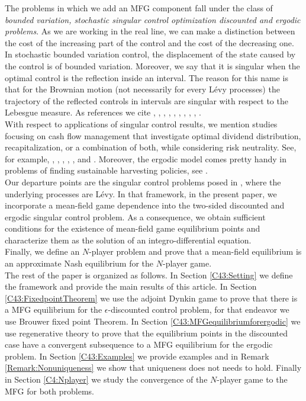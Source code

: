 \documentclass{article}
\begin{document}
The problems in which we add an MFG component fall under the class of \emph{bounded variation, stochastic singular control optimization discounted and ergodic problems}. As we are working in the real line, we can make a distinction between the cost of the increasing part of the control and the cost of the decreasing one. In stochastic bounded variation control, the displacement of the state caused by the control is of bounded variation. Moreover, we say that it is singular when the optimal control is the reflection inside an interval. The reason for this name is that for the Brownian motion (not necessarily for every L\'evy processes) the trajectory of the reflected controls in intervals are singular with respect to the Lebesgue measure. 
As references we cite \cite{KARATZAS}, \cite{MenaldiRobin}, \cite{AW}, \cite{AJackZervos}, \cite{AW2},   \cite{MenaldiRobin2013}, \cite{wuchen}, \cite{ACPZ}, \cite{KXYZ}, \cite{Alvarez}. 
\\
With respect to applications of singular control results, we mention studies focusing on cash flow management that investigate optimal dividend distribution, recapitalization, or a combination of both, while considering risk neutrality. 
See, for example, \cite{AT}, \cite{HT}, \cite{JS}, \cite{P}, \cite{BK}, and \cite{SLG}. 
Moreover, the ergodic model comes pretty handy  in problems of finding sustainable harvesting policies, see \cite[Chapter I]{CLARK}.
\\
Our departure points are the singular control problems posed in \cite{MO}, where the underlying processes are L\'evy. In that framework, in the present paper, we incorporate a mean-field game
dependence into the two-sided discounted and ergodic singular control problem. As a consequence, we obtain sufficient conditions
for the existence of mean-field game equilibrium points and characterize them as the solution of an integro-differential equation. \\
Finally, we define an $N$-player problem and prove that a mean-field equilibrium
is an approximate Nash equilibrium for the $N$-player game.
 \\
The rest of the paper is organized as follows.
In Section \ref{C43:Setting} we define the framework and provide the main results of this article.
In Section \ref{C43:FixedpointTheorem} we use the adjoint Dynkin game to prove that there is a MFG equilibrium for the $\epsilon$-discounted control problem, for that endeavor we use Brouwer fixed point Theorem.
In Section \ref{C43:MFGequilibriumforergodic} we use regenerative theory to prove that the equilibrium points in the discounted case have a convergent subsequence to a MFG equilibrium for the ergodic problem.
In Section \ref{C43:Examples} we provide examples and in Remark \ref{Remark:Nonuniqueness} we show that uniqueness does not needs to hold. Finally in Section
\ref{C4:Nplayer} we study the convergence of the $N$-player game to the MFG for both problems.
\end{document}
